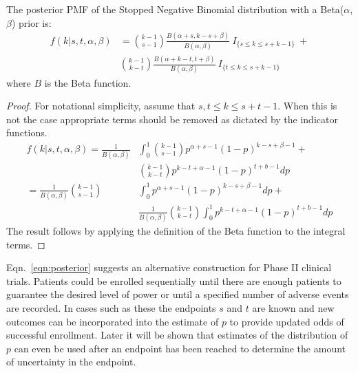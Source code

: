 \documentclass[12pt]{article}         %
\begin{document}

\begin{prop}
The posterior PMF of the Stopped Negative Binomial distribution with a Beta($\alpha$, $\beta$) prior is:
\begin{align} \label{eqn:posterior}
f(k | s, t, \alpha, \beta) &= 
  {k-1 \choose s-1} \frac{B\left(\alpha+s, k-s+\beta \right)}{B(\alpha, \beta)} 
    \ I_{\{s \leq k \leq s+k-1\}} \ + \nonumber \\
  & {k-1 \choose k-t} 
    \frac{B\left(\alpha + k - t, t+\beta\right)}{B(\alpha, \beta)} 
    \ I_{\{t \leq k \leq s+k-1\}}
\end{align}
where $B$ is the Beta function.
\end{prop}
\begin{proof}
For notational simplicity, assume that $s,t \leq k \leq s+t-1$. When this is not the case appropriate terms should be removed as dictated by the indicator functions.
\begin{align*}
f(k | s, t, \alpha, \beta) = \frac{1}{B(\alpha, \beta)} & \int_0^1 {k-1 \choose s-1} p^{\alpha +s -1} \left(1-p\right)^{k-s+\beta-1} + \\
 & {k-1 \choose k-t} p^{k-t+\alpha-1}\left(1-p\right)^{t+b-1} dp \\
= \frac{1}{B(\alpha, \beta)}  {k-1 \choose s-1} & \int_0^1  p^{\alpha +s -1} \left(1-p\right)^{k-s+\beta-1} dp + \\
 & \frac{1}{B(\alpha, \beta)} {k-1 \choose k-t} \int_0^1  p^{k-t+\alpha-1}\left(1-p\right)^{t+b-1} dp
\end{align*}
The result follows by applying the definition of the Beta function to the integral terms.
\end{proof}

Eqn.~\ref{eqn:posterior} suggests an alternative construction for 
Phase II clinical trials.  Patients could be 
enrolled sequentially until there are enough patients to guarantee the 
desired level of power or until a specified number of adverse events are 
recorded. In cases such as these the endpoints $s$ and $t$ are known and 
new outcomes can be incorporated into the estimate of
$p$ to provide updated odds of successful enrollment. Later it will be shown 
that estimates of the distribution of $p$ can even be used after an endpoint 
has been reached to determine the amount of uncertainty in the endpoint. 
\end{document}
